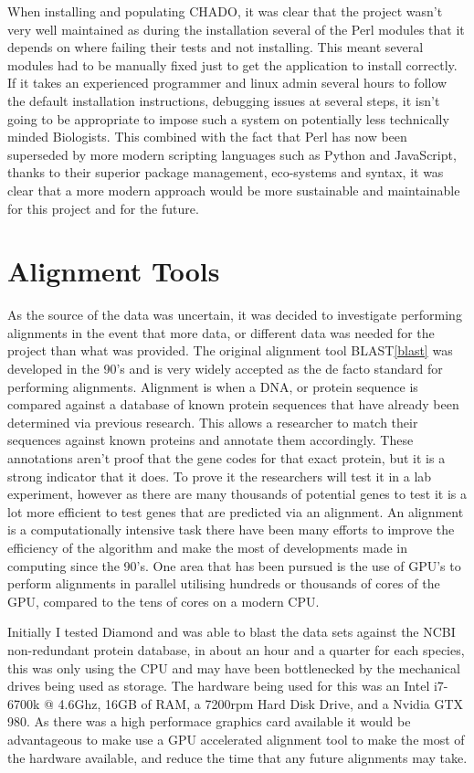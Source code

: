 When installing and populating CHADO, it was clear that the project wasn't very well maintained as during the installation several of the Perl modules that it depends on where failing their tests and not installing. This meant several modules had to be manually fixed just to get the application to install correctly. If it takes an experienced programmer and linux admin several hours to follow the default installation instructions, debugging issues at several steps, it isn't going to be appropriate to impose such a system on potentially less technically minded Biologists. This combined with the fact that Perl has now been superseded by more modern scripting languages such as Python\cite{python} and JavaScript\cite{javascript}, thanks to their superior package management, eco-systems and syntax, it was clear that a more modern approach would be more sustainable and maintainable for this project and for the future. 

\section{Alignment Tools}

As the source of the data was uncertain, it was decided to investigate performing alignments in the event that more data, or different data was needed for the project than what was provided. The original alignment tool BLAST\ref{blast} was developed in the 90's and is very widely accepted as the de facto standard for performing alignments. Alignment is when a DNA, or protein sequence is compared against a database of known protein sequences that have already been determined via previous research. This allows a researcher to match their sequences against known proteins and annotate them accordingly. These annotations aren't proof that the gene codes for that exact protein, but it is a strong indicator that it does. To prove it the researchers will test it in a lab experiment, however as there are many thousands of potential genes to test it is a lot more efficient to test genes that are predicted via an alignment. An alignment is a computationally intensive task there have been many efforts to improve the efficiency of the algorithm and make the most of developments made in computing since the 90's. One area that has been pursued is the use of GPU's to perform alignments in parallel utilising hundreds or thousands of cores of the GPU, compared to the tens of cores on a modern CPU. 

Initially I tested Diamond\cite{diamond} and was able to blast the data sets against the NCBI\cite{ncbi} non-redundant protein database, in about an hour and a quarter for each species, this was only using the CPU and may have been bottlenecked by the mechanical drives being used as storage. The hardware being used for this was an Intel i7-6700k @ 4.6Ghz, 16GB of RAM, a 7200rpm Hard Disk Drive, and a Nvidia GTX 980. As there was a high performace graphics card available it would be advantageous to make use a GPU accelerated alignment tool to make the most of the hardware available, and reduce the time that any future alignments may take. 

